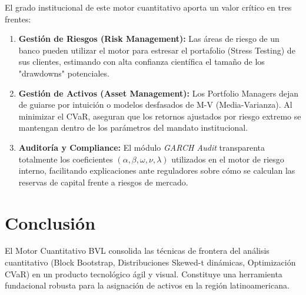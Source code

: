 \documentclass[11pt,a4paper]{article}
\begin{document}
El grado institucional de este motor cuantitativo aporta un valor crítico en tres frentes:

\begin{enumerate}
    \item \textbf{Gestión de Riesgos (Risk Management):} Las áreas de riesgo de un banco pueden utilizar el motor para estresar el portafolio (Stress Testing) de sus clientes, estimando con alta confianza científica el tamaño de los "drawdowns" potenciales.
    \item \textbf{Gestión de Activos (Asset Management):} Los Portfolio Managers dejan de guiarse por intuición o modelos desfasados de M-V (Media-Varianza). Al minimizar el CVaR, aseguran que los retornos ajustados por riesgo extremo se mantengan dentro de los parámetros del mandato institucional.
    \item \textbf{Auditoría y Compliance:} El módulo \textit{GARCH Audit} transparenta totalmente los coeficientes $(\alpha, \beta, \omega, \nu, \lambda)$ utilizados en el motor de riesgo interno, facilitando explicaciones ante reguladores sobre cómo se calculan las reservas de capital frente a riesgos de mercado.
\end{enumerate}

\section{Conclusión}
El Motor Cuantitativo BVL consolida las técnicas de frontera del análisis cuantitativo (Block Bootstrap, Distribuciones Skewed-t dinámicas, Optimización CVaR) en un producto tecnológico ágil y visual. Constituye una herramienta fundacional robusta para la asignación de activos en la región latinoamericana.
\end{document}

